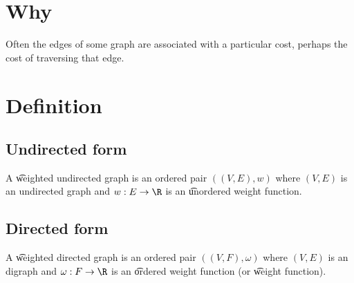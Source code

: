 
\section*{Why}

Often the edges of some graph are associated with a particular cost, perhaps the cost of traversing that edge.

\section*{Definition}

\subsection*{Undirected form}

A \t{weighted undirected graph} is an ordered pair $((V, E),w)$ where $(V, E)$ is an undirected graph and $w: E \to \R $ is an \t{unordered weight function}.

\subsection*{Directed form}

A \t{weighted directed graph} is an ordered pair $((V, F),\omega )$ where $(V, E)$ is an digraph and $\omega : F \to \R $ is an \t{ordered weight function} (or \t{weight function}).

\blankpage